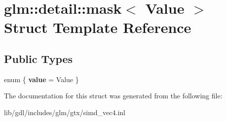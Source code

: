 \hypertarget{structglm_1_1detail_1_1mask}{}\section{glm\+:\+:detail\+:\+:mask$<$ Value $>$ Struct Template Reference}
\label{structglm_1_1detail_1_1mask}
\subsection*{Public Types}
\begin{DoxyCompactItemize}
\item 
\hypertarget{structglm_1_1detail_1_1mask_a7b4eee8af2c3b600fcb6f8d6a699162f}{}enum \{ {\bfseries value} = Value
 \}\label{structglm_1_1detail_1_1mask_a7b4eee8af2c3b600fcb6f8d6a699162f}

\end{DoxyCompactItemize}


The documentation for this struct was generated from the following file\+:\begin{DoxyCompactItemize}
\item 
lib/gdl/includes/glm/gtx/simd\+\_\+vec4.\+inl\end{DoxyCompactItemize}
